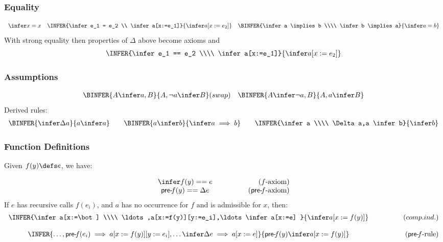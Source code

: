 \subsubsection{Equality}

$$\begin{array}{lrr}
   \infer x=x
   &
   \INFER%
     {\infer e_1 = e_2 \\ \infer a[x:=e_1]}%
     {\infer a[x:=e_2]}
   &
   \BINFER%
     {\infer a \implies b \\\\ \infer b \implies a}%
     {\infer a=b}
\end{array}$$
With strong equality then properties of $\Delta$ above become axioms
and
$$
  \INFER%
    {\infer e_1 == e_2 \\\\ \infer a[x:=e_1]}%
    {\infer a[x:=e_2]}
$$

\subsubsection{Assumptions}

\begin{eqnarray*}
   \BINFER%
     {A \infer a,B}%
     {A,\lnot a \infer B}
   &
   (swap)
   &
   \BINFER%
     {A \infer \lnot a, B}%
     {A,a \infer B}%
\end{eqnarray*}
Derived rules:
$$\begin{array}{c@{\qquad}c@{\qquad}c}
   \BINFER%
     {\infer \Delta a}%
     {a \infer a}
   &
   \BINFER%
     {a \infer b}%
     {\infer a \implies b}
   &
   \INFER%
     {\infer a \\\\ \Delta a,a \infer b}%
     {\infer b}
\end{array}$$


\subsubsection{Function Definitions}

Given $f(y) \defs e$, we have:

$$\begin{array}{c@{\quad}l@{\qquad\qquad}r}
   \infer f(y) == e && (f\mbox{-axiom})
\\ \pre f(y) == \Delta e && (\pre f\mbox{-axiom})
\end{array}$$
If $e$ has recursive calls $f(e_i)$, and $a$ has no occurrence for $f$
and is admissible for $x$,
then:
$$\begin{array}{c@{\quad}l@{\qquad\qquad}r}
   \INFER%
     {\infer a[x:=\bot]
      \\\\
      \ldots,a[x:=f(y)][y:=e_i],\ldots \infer a[x:=e]
      }
     {\infer a[x:=f(y)]}
   && (comp. ind.)
\\ \\
  \INFER%
    {\ldots,\pre f(e_i) \implies a[x:=f(y)][y:=e_i],\ldots
     \infer
     \Delta e \implies a[x:=e]}
    {\pre f(y) \infer a[x:=f(y)]}
    && (\pre f\mbox{-rule})
\end{array}$$


